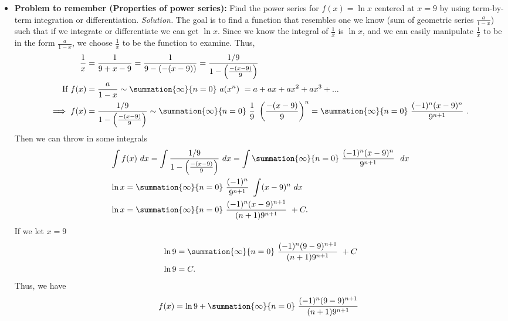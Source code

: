 \documentclass{report}
\begin{document}
\begin{itemize}
\begin{remark}
                \end{remark}
            \item \textbf{Problem to remember (Properties of power series):} Find the power series for $f(x) = \ln{x}$ centered at $x=9$ by using term-by-term integration or differentiation.
                \smallbreak \noindent
                \textit{Solution.} The goal is to find a function that resembles one we know (sum of geometric series $\frac{a}{1-x}$) such that if we integrate or differentiate we can get $\ln{x}$. Since we know the integral of $\frac{1}{x}$ is $\ln{x}$, and we can easily manipulate $\frac{1}{x}$ to be in the form $\frac{a}{1-x}$, we choose $\frac{1}{x} $ to be the function to examine. Thus, 
                \begin{align*}
                    \frac{1}{x} &= \frac{1}{9+x-9} = \frac{1}{9-(-(x-9))} = \frac{1/9}{1-\left(\frac{-(x-9)}{9}\right)} \\
                    \text{If } f(x) &= \frac{a}{1-x} \sim \summation{\infty}{n=0}\ a(x^{n})\ = a + ax + ax^{2} + ax^{3} + ... \\
                    \implies f(x) &= \frac{1/9}{1-\left(\frac{-(x-9)}{9}\right)} \sim \summation{\infty}{n=0}\ \frac{1}{9}\ \left(\frac{-(x-9)}{9}\right)^{n} = \summation{\infty}{n=0}\ \frac{(-1)^{n}(x-9)^{n}}{9^{n+1}}\ 
                .\end{align*}
                Then we can throw in some integrals
                \begin{align*}
                    &\int f(x)\ dx = \int \frac{1/9}{1-\left(\frac{-(x-9)}{9}\right)}\ dx = \int \summation{\infty}{n=0}\ \frac{(-1)^{n}(x-9)^{n}}{9^{n+1}}\ \ dx \\
                    &\ln{x} = \summation{\infty}{n=0}\ \frac{(-1)^{n}}{9^{n+1}}\  \int (x-9)^{n}\ dx \\
                    &\ln{x}  =  \summation{\infty}{n=0}\ \frac{(-1)^{n}(x-9)^{n+1}}{(n+1)9^{n+1}}\ + C 
                .\end{align*}
                If we let $x=9$
                \begin{align*}
                    &\ln{9}  =  \summation{\infty}{n=0}\ \frac{(-1)^{n}(9-9)^{n+1}}{(n+1)9^{n+1}}\ + C  \\
                    &\ln{9} = C
                .\end{align*}
                Thus, we have
                \begin{align*}
                    f(x) = \ln{9} + \summation{\infty}{n=0}\ \frac{(-1)^{n}(9-9)^{n+1}}{(n+1)9^{n+1}}\  \\

\end{align*}
\end{itemize}
\end{document}
